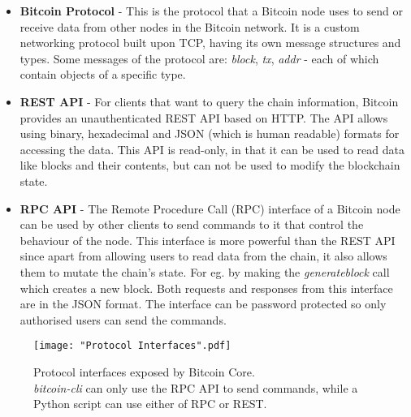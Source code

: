 \begin{itemize}
    \item \textbf{Bitcoin Protocol} - This is the protocol that a Bitcoin node uses to send or receive data from other nodes in the Bitcoin network. It is a custom networking protocol built upon TCP, having its own message structures and types. \cite{bitcoinProtocol}
    Some messages of the protocol are: \textit{block}, \textit{tx}, \textit{addr} - each of which contain objects of a specific type.

    \item \textbf{REST API} - For clients that want to query the chain information, Bitcoin provides an unauthenticated REST API based on HTTP. \cite{btcREST} 
    The API allows using binary, hexadecimal and JSON (which is human readable) formats for accessing the data.
    This API is read-only, in that it can be used to read data like blocks and their contents, but can not be used to modify the blockchain state.

    \item \textbf{RPC API} - The Remote Procedure Call (RPC) interface of a Bitcoin node can be used by other clients to send commands to it that control the behaviour of the node. \cite{btcRPC}
    This interface is more powerful than the REST API since apart from allowing users to read data from the chain, it also allows them to mutate the chain's state. For eg. by making the \textit{generateblock} call which creates a new block.
    Both requests and responses from this interface are in the JSON format.
    The interface can be password protected so only authorised users can send the commands.
\end{itemize}

\newpage


\hspace{0pt}
\vfill
\begin{figure}[!htb]
    \centering
    \texttt{[image: "Protocol Interfaces".pdf]}
    \caption[Protocol interfaces exposed by Bitcoin Core.]
    {
        Protocol interfaces exposed by Bitcoin Core. \\
        \footnotesize
        \textit{bitcoin-cli} can only use the RPC API to send commands, while a Python script can use either of RPC or REST.
    }
    \label{fig-btc-arch}
\end{figure}
\vfill
\hspace{0pt}
